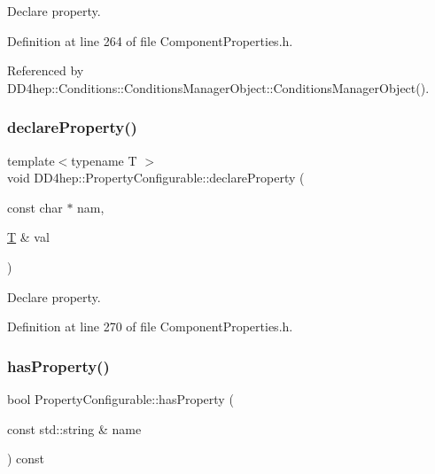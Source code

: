 Declare property. 



Definition at line 264 of file Component\+Properties.\+h.



Referenced by D\+D4hep\+::\+Conditions\+::\+Conditions\+Manager\+Object\+::\+Conditions\+Manager\+Object().

\hypertarget{class_d_d4hep_1_1_property_configurable_a8883181e55de099110ac51b04b7b8da1}{}\label{class_d_d4hep_1_1_property_configurable_a8883181e55de099110ac51b04b7b8da1} 
\subsubsection{\texorpdfstring{declare\+Property()}{declareProperty()}\hspace{0.1cm}{\footnotesize\ttfamily [2/2]}}
{\footnotesize\ttfamily template$<$typename T $>$ \\
void D\+D4hep\+::\+Property\+Configurable\+::declare\+Property (\begin{DoxyParamCaption}\item[{const char $\ast$}]{nam,  }\item[{\hyperlink{class_t}{T} \&}]{val }\end{DoxyParamCaption})}



Declare property. 



Definition at line 270 of file Component\+Properties.\+h.

\hypertarget{class_d_d4hep_1_1_property_configurable_ad3c5d3806bc3a4081a2b923918da894c}{}\label{class_d_d4hep_1_1_property_configurable_ad3c5d3806bc3a4081a2b923918da894c} 
\subsubsection{\texorpdfstring{has\+Property()}{hasProperty()}}
{\footnotesize\ttfamily bool Property\+Configurable\+::has\+Property (\begin{DoxyParamCaption}\item[{const std\+::string \&}]{name }\end{DoxyParamCaption}) const}



